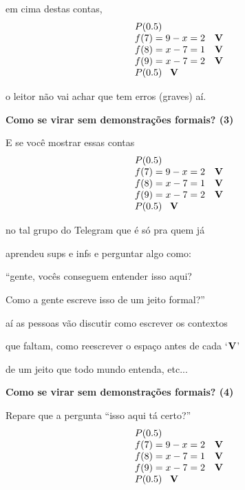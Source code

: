 \documentclass[oneside,12pt]{article}
\begin{document}
em cima destas contas,
%
$$\begin{array}{ll}
  P(0.5) \\
  f(7) = 9-x = 2 & \mathbf{V} \\ 
  f(8) = x-7 = 1 & \mathbf{V} \\ 
  f(9) = x-7 = 2 & \mathbf{V} \\ 
  P(0.5) \;\;\; \mathbf{V} \\
  \end{array}
$$

o leitor não vai achar que tem erros (graves) aí.

\newpage


{\bf Como se virar sem demonstrações formais? (3)}

E se você mostrar essas contas
%
$$\begin{array}{ll}
  P(0.5) \\
  f(7) = 9-x = 2 & \mathbf{V} \\ 
  f(8) = x-7 = 1 & \mathbf{V} \\ 
  f(9) = x-7 = 2 & \mathbf{V} \\ 
  P(0.5) \;\;\; \mathbf{V} \\
  \end{array}
$$

no tal grupo do Telegram que é só pra quem já

aprendeu sups e infs e perguntar algo como:

``gente, vocês conseguem entender isso aqui?

Como a gente escreve isso de um jeito formal?''

aí as pessoas vão discutir como escrever os contextos

que faltam, como reescrever o espaço antes de cada `$\mathbf{V}$'

de um jeito que todo mundo entenda, etc...

\newpage


{\bf Como se virar sem demonstrações formais? (4)}

Repare que a pergunta ``isso aqui tá certo?''
%
$$\begin{array}{ll}
  P(0.5) \\
  f(7) = 9-x = 2 & \mathbf{V} \\ 
  f(8) = x-7 = 1 & \mathbf{V} \\ 
  f(9) = x-7 = 2 & \mathbf{V} \\ 
  P(0.5) \;\;\; \mathbf{V} \\
  \end{array}
$$
\end{document}
